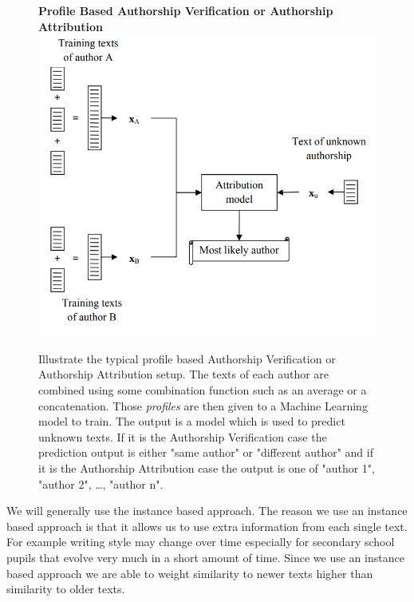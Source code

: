 \begin{figure}[htb]
    \centering
    \textbf{Profile Based Authorship Verification or Authorship Attribution}
    \includegraphics[scale=0.4]{./pictures/method/profile_based.png}
    \caption{Illustrate the typical profile based Authorship Verification or
        Authorship Attribution setup.\cite{stamatos2009} The texts of each
        author are combined using some combination function such as an average
        or a concatenation. Those \textit{profiles} are then given to a Machine
        Learning model to train. The output is a model which is used to predict
        unknown texts. If it is the Authorship Verification case the prediction
        output is either "same author" or "different author" and if it is the
        Authorship Attribution case the output is one of "author 1", "author 2",
        \dots, "author n".}
    \label{fig:profile_based}
\end{figure}

We will generally use the instance based approach. The reason we use an instance
based approach is that it allows us to use extra information from each single
text. For example writing style may change over time especially for secondary
school pupils that evolve very much in a short amount of time. Since we use an
instance based approach we are able to weight similarity to newer texts higher
than similarity to older texts.

